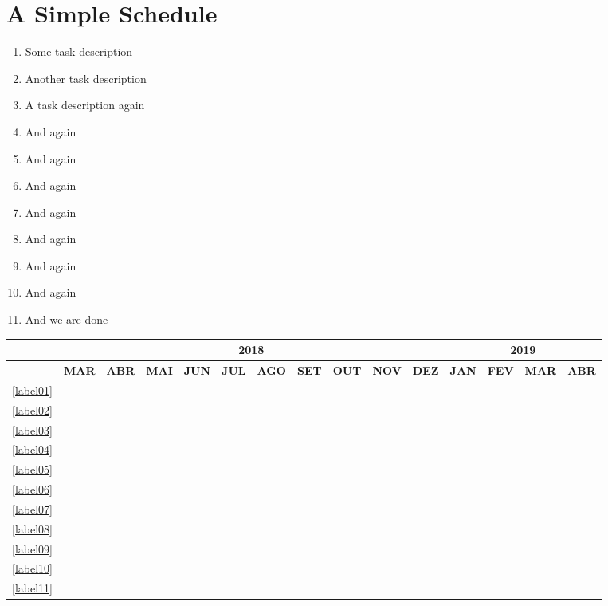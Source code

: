 \documentclass{article}
\begin{document}
\section{A Simple Schedule}

\begin{enumerate}
	\item \label{label01} Some task description
	\item \label{label02} Another task description
	\item \label{label03} A task description again
	\item \label{label04} And again
	\item \label{label05} And again
	\item \label{label06} And again
	\item \label{label07} And again
	\item \label{label08} And again
	\item \label{label09} And again
	\item \label{label10} And again
	\item \label{label11} And we are done
\end{enumerate}


\begin{table}[!htbp]
	\centering
		\begin{tabular}{|c||c|c|c|c|c|c|c|c|c|c|c|c|c|c|}
		\hline
		&\multicolumn{10}{c|}{2018}&\multicolumn{4}{c|}{2019}\\
		\hline
		&\tiny{\textbf{MAR}}&\tiny{\textbf{ABR}}&\tiny{\textbf{MAI}}&\tiny{\textbf{JUN}}&\tiny{\textbf{JUL}}&\tiny{\textbf{AGO}}&\tiny{\textbf{SET}}&\tiny{\textbf{OUT}}&\tiny{\textbf{NOV}}&\tiny{\textbf{DEZ}}&\tiny{\textbf{JAN}}&\tiny{\textbf{FEV}}&\tiny{\textbf{MAR}}&\tiny{\textbf{ABR}}\\
		\hline \hline
		\ref{label01} &\X&&&&&&&&&&&&&\\
		\hline
		\ref{label02}&&\X&\X&\X&\X&&&&&&&&&\\
		\hline	
		\ref{label03}&\X&\X&\X&&&&&&&&&&&\\
		\hline			
		\ref{label04}&&&\X&\X&&&&&&&&&&\\
		\hline
		\ref{label05}&&&&\X&\X&&&&&&&&&\\
		\hline	
		\ref{label06}&&&&\X&\X&&&&&&&&&\\
		\hline	
		\ref{label07}&&&&&\X&\X&\X&\X&&&&&&\\
		\hline	
		\ref{label08}&&&&&&&&\X&\X&\X&&&&\\
		\hline	
		\ref{label09}&&&&&&&&&&\X&\X&\X&&\\
		\hline	
		\ref{label10}&&&&&&&&&&\X&\X&\X&\X&\\
		\hline
		\ref{label11}&&&&&&&&&&&&&&\X\\
		\hline	
		\end{tabular}
\end{table}
\end{document}
